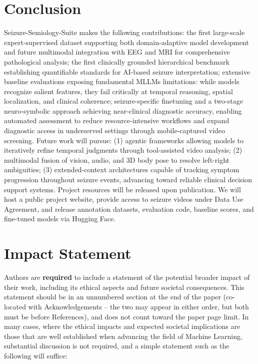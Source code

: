 \documentclass{article}
\theoremstyle{plain}
\theoremstyle{definition}
\theoremstyle{remark}
\begin{document}
\section{Conclusion}
Seizure-Semiology-Suite makes the following contributions: the first large-scale expert-supervised dataset supporting both domain-adaptive model development and future multimodal integration with EEG and MRI for comprehensive pathological analysis; the first clinically grounded hierarchical benchmark establishing quantifiable standards for AI-based seizure interpretation; extensive baseline evaluations exposing fundamental MLLMs limitations: while models recognize salient features, they fail critically at temporal reasoning, spatial localization, and clinical coherence; seizure-specific finetuning and a two-stage neuro-symbolic approach achieving near-clinical diagnostic accuracy, enabling automated assessment to reduce resource-intensive workflows and expand diagnostic access in underserved settings through mobile-captured video screening. Future work will pursue: (1) agentic frameworks allowing models to iteratively refine temporal judgments through tool-assisted video analysis; (2) multimodal fusion of vision, audio, and 3D body pose to resolve left-right ambiguities; (3) extended-context architectures capable of tracking symptom progression throughout seizure events, advancing toward reliable clinical decision support systems. Project resources will be released upon publication. We will host a public project website, provide access to seizure videos under Data Use Agreement, and release annotation datasets, evaluation code, baseline scores, and fine-tuned models via Hugging Face.

\newpage

\section*{Impact Statement}

\iffalse
Authors are \textbf{required} to include a statement of the potential broader
impact of their work, including its ethical aspects and future societal
consequences. This statement should be in an unnumbered section at the end of
the paper (co-located with Acknowledgements -- the two may appear in either
order, but both must be before References), and does not count toward the paper
page limit. In many cases, where the ethical impacts and expected societal
implications are those that are well established when advancing the field of
Machine Learning, substantial discussion is not required, and a simple
statement such as the following will suffice:
\end{document}
